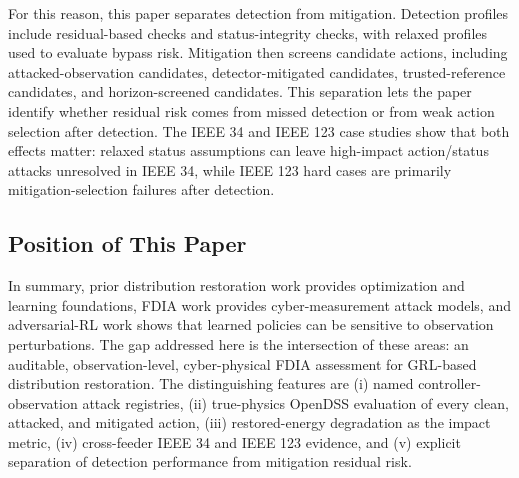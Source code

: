 For this reason, this paper separates detection from mitigation. Detection profiles include residual-based checks and status-integrity checks, with relaxed profiles used to evaluate bypass risk. Mitigation then screens candidate actions, including attacked-observation candidates, detector-mitigated candidates, trusted-reference candidates, and horizon-screened candidates. This separation lets the paper identify whether residual risk comes from missed detection or from weak action selection after detection. The IEEE 34 and IEEE 123 case studies show that both effects matter: relaxed status assumptions can leave high-impact action/status attacks unresolved in IEEE 34, while IEEE 123 hard cases are primarily mitigation-selection failures after detection.

\subsection{Position of This Paper}

In summary, prior distribution restoration work provides optimization and learning foundations, FDIA work provides cyber-measurement attack models, and adversarial-RL work shows that learned policies can be sensitive to observation perturbations. The gap addressed here is the intersection of these areas: an auditable, observation-level, cyber-physical FDIA assessment for GRL-based distribution restoration. The distinguishing features are (i) named controller-observation attack registries, (ii) true-physics OpenDSS evaluation of every clean, attacked, and mitigated action, (iii) restored-energy degradation as the impact metric, (iv) cross-feeder IEEE 34 and IEEE 123 evidence, and (v) explicit separation of detection performance from mitigation residual risk.
